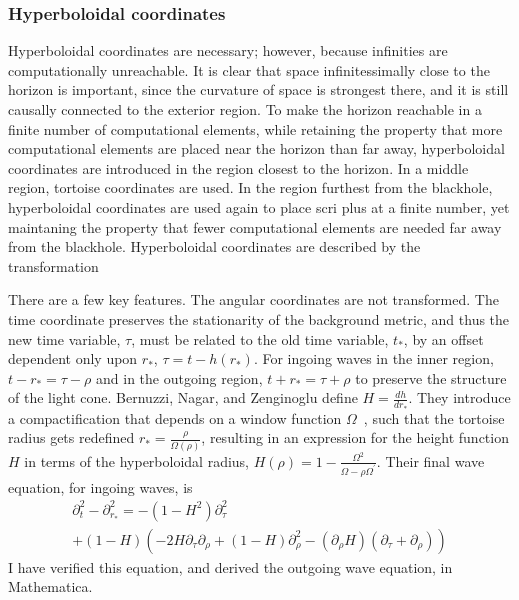 \subsubsection{Hyperboloidal coordinates}  
Hyperboloidal coordinates are necessary; however, because infinities are computationally unreachable. It is clear that space infinitessimally close to the horizon is important, since the curvature of space is strongest there, and it is still causally connected to the exterior region. To make the horizon reachable in a finite number of computational elements, while retaining the property that more computational elements are placed near the horizon than far away, hyperboloidal coordinates are introduced in the region closest to the horizon. In a middle region, tortoise coordinates are used. In the region furthest from the blackhole, hyperboloidal coordinates are used again to place scri plus at a finite number, yet maintaning the property that fewer computational elements are needed far away from the blackhole. Hyperboloidal coordinates are described by the transformation~\cite{hyperboloidalCoordinates}

There are a few key features. The angular coordinates are not transformed. The time coordinate preserves the stationarity of the background metric, and thus the new time variable, $\tau$, must be related to the old time variable, $t_*$, by an offset dependent only upon $r_*$, $\tau=t-h(r_*)$. For ingoing waves in the inner region, $t-r_*=\tau-\rho$ and in the outgoing region, $t+r_*=\tau+\rho$ to preserve the structure of the light cone. Bernuzzi, Nagar, and Zenginoglu define $H=\frac{dh}{dr_*}$. They introduce a compactification that depends on a window function $\Omega$~\cite{OmegaTransferFunction}, such that the tortoise radius gets redefined  $r_*=\frac{\rho}{\Omega(\rho)}$, resulting in an expression for the height function $H$ in terms of the hyperboloidal radius,  $H(\rho)=1-\frac{\Omega^2}{\Omega-\rho\Omega^\prime}$. Their final wave equation, for ingoing waves, is~\cite{hyperboloidalCoordinates}
  \begin{eqnarray}
    \partial_t^2-\partial_{r_*}^2=-(1-H^2)\partial_\tau^2\nonumber\\
    +(1-H)(-2H\partial_\tau\partial_\rho+(1-H)\partial_\rho^2-(\partial_\rho H)(\partial_\tau+\partial_\rho))
  \end{eqnarray}    
I have verified this equation, and derived the outgoing wave equation, in Mathematica.

  



